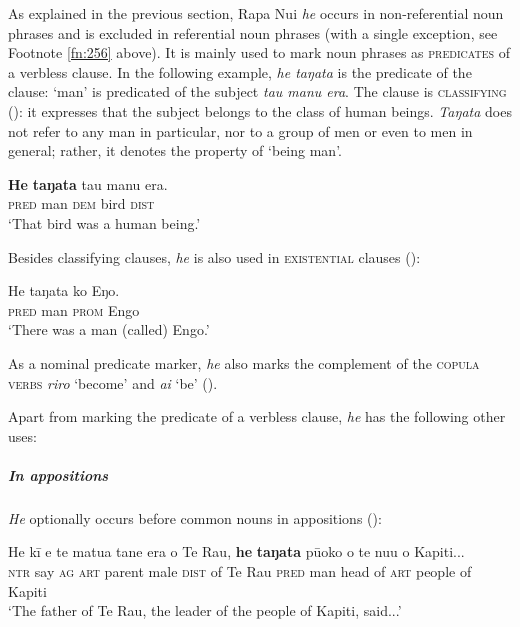 As explained in the previous section, Rapa Nui \textit{he} occurs in non-referential noun phrases and is excluded in referential noun phrases (with a single exception, see Footnote \ref{fn:256} above). It is mainly used to mark noun phrases as \textsc{predicates} of a verbless clause. In the following example, \textit{he taŋata} is the predicate of the clause: ‘man’ is predicated of the subject \textit{tau manu era}. The clause is \textsc{classifying} (): it expresses that the subject belongs to the class of human beings. \textit{Taŋata} does not refer to any man in particular, nor to a group of men or even to men in general; rather, it denotes the property of ‘being man’.

\ea\label{ex:5.42}
\gll \textbf{He} \textbf{taŋata} tau manu era. \\
\textsc{pred} man \textsc{dem} bird \textsc{dist} \\

\glt
‘That bird was a human being.’ \textstyleExampleref{[Mtx-7-12.069]}
\z

Besides classifying clauses, \textit{he} is also used in \textsc{existential} clauses ():

\ea\label{ex:5.43}
\gll He taŋata ko Eŋo. \\
\textsc{pred} man \textsc{prom} Engo \\

\glt
‘There was a man (called) Engo.’ \textstyleExampleref{[Mtx-7-28.001]}
\z

As a nominal predicate marker, \textit{he} also marks the complement of the \textsc{copula verbs} \textit{riro} ‘become’ and \textit{ai} ‘be’ ().

Apart from marking the predicate of a verbless clause, \textit{he} has the following other uses:

\subparagraph{In appositions} \textit{He} optionally occurs before common nouns in appositions ():

\ea\label{ex:5.44}
\gll He kī e te matu{\ꞌ}a tane era o Te Rau, \textbf{he} \textbf{taŋata} pū{\ꞌ}oko  o te nu{\ꞌ}u o Kapiti...\\
\textsc{ntr} say \textsc{ag} \textsc{art} parent male \textsc{dist} of Te Rau \textsc{pred} man head  of \textsc{art} people of Kapiti\\

\glt 
‘The father of Te Rau, the leader of the people of Kapiti, said...’ \textstyleExampleref{[R347.089]} 
\z

